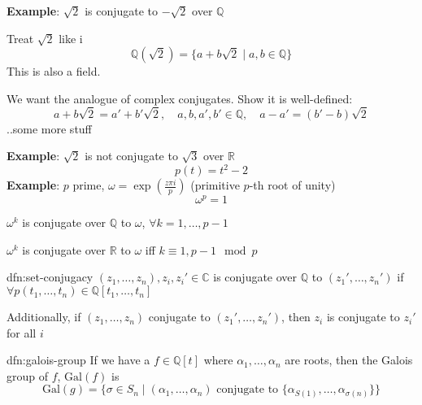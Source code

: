 \documentclass{article}
\begin{document}
\textbf{Example}: $\sqrt{2}$ is conjugate to $-\sqrt{2}$ over $\mathbb{Q}$

Treat $\sqrt{2}$ like i
\[\mathbb{Q}(\sqrt{2}) = \{a + b\sqrt{2} \mid a,b\in \mathbb{Q}\}\]
This is also a field.

We want the analogue of complex conjugates. Show it is well-defined:
\[a + b \sqrt{2} = a' + b' \sqrt{2}, \quad a,b,a',b'\in \mathbb{Q}, \quad a - a' = (b ' - b) \sqrt{2}\]
..some more stuff

\textbf{Example}: $\sqrt{2}$ is not conjugate to $\sqrt{3}$ over $\mathbb{R}$
\[p(t) = t^{2} - 2\]
\textbf{Example}: $p$ prime, $\omega = \exp\left( \frac{z\pi i}{p} \right)$ (primitive $p$-th root of unity)
\[\omega^{p} = 1\]

$\omega^{k}$ is conjugate over $\mathbb{Q}$ to $\omega$, $\forall k = 1,\dots,p-1$

$\omega^{k}$ is conjugate over $\mathbb{R}$ to $\omega$ iff $k \equiv 1, p - 1 \mod p$

\begin{dfn}{dfn:set-conjugacy}{}
    $(z_{1},\dots,z_{n}), z_{i}, z_{i}' \in \mathbb{C}$
    is conjugate over $\mathbb{Q}$ to $(z_{1}',\dots,z_{n}')$
    if $\forall p(t_{1},\dots,t_{n})\in \mathbb{Q}[t_{1},\dots,t_{n}]$

    \longrule{0.08ex}

    Additionally, if $(z_{1},\dots,z_{n})$ conjugate to $(z_{1}',\dots,z_{n}')$, then $z_{i}$ is conjugate to $z_{i}'$ for all $i$
\end{dfn}

\begin{dfn}{dfn:galois-group}{}
    If we have a $f\in \mathbb{Q}[t]$ where $\alpha_{1},\dots,\alpha_{n}$ are roots, then the Galois group of $f$, $\mathrm{Gal}(f)$ is
    \[\mathrm{Gal}(g) = \{\sigma \in S_{n} \mid (\alpha_{1},\dots,\alpha_{n}) \text{ conjugate to } \{\alpha_{S(1)},\dots,\alpha_{\sigma(n)}\}\}\]
\end{dfn}
\end{document}
